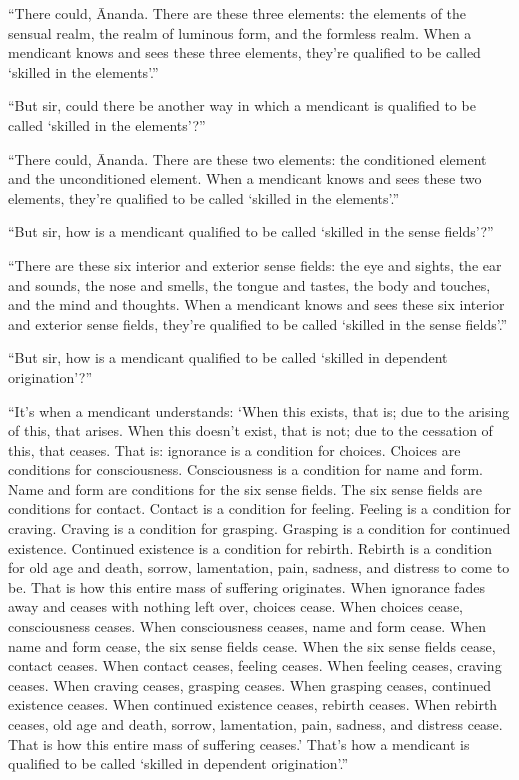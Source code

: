 \documentclass[12pt,openany]{book}%
\begin{document}
“There could, Ānanda. There are these three elements: the elements of the sensual realm, the realm of luminous form, and the formless realm. When a mendicant knows and sees these three elements, they’re qualified to be called ‘skilled in the elements’.” 

“But sir, could there be another way in which a mendicant is qualified to be called ‘skilled in the elements’?” 

“There could, Ānanda. There are these two elements: the conditioned element and the unconditioned element. When a mendicant knows and sees these two elements, they’re qualified to be called ‘skilled in the elements’.” 

“But sir, how is a mendicant qualified to be called ‘skilled in the sense fields’?” 

“There are these six interior and exterior sense fields: the eye and sights, the ear and sounds, the nose and smells, the tongue and tastes, the body and touches, and the mind and thoughts. When a mendicant knows and sees these six interior and exterior sense fields, they’re qualified to be called ‘skilled in the sense fields’.” 

“But sir, how is a mendicant qualified to be called ‘skilled in dependent origination’?” 

“It’s when a mendicant understands: ‘When this exists, that is; due to the arising of this, that arises. When this doesn’t exist, that is not; due to the cessation of this, that ceases. That is: ignorance is a condition for choices. Choices are conditions for consciousness. Consciousness is a condition for name and form. Name and form are conditions for the six sense fields. The six sense fields are conditions for contact. Contact is a condition for feeling. Feeling is a condition for craving. Craving is a condition for grasping. Grasping is a condition for continued existence. Continued existence is a condition for rebirth. Rebirth is a condition for old age and death, sorrow, lamentation, pain, sadness, and distress to come to be. That is how this entire mass of suffering originates. When ignorance fades away and ceases with nothing left over, choices cease. When choices cease, consciousness ceases. When consciousness ceases, name and form cease. When name and form cease, the six sense fields cease. When the six sense fields cease, contact ceases. When contact ceases, feeling ceases. When feeling ceases, craving ceases. When craving ceases, grasping ceases. When grasping ceases, continued existence ceases. When continued existence ceases, rebirth ceases. When rebirth ceases, old age and death, sorrow, lamentation, pain, sadness, and distress cease. That is how this entire mass of suffering ceases.’ That’s how a mendicant is qualified to be called ‘skilled in dependent origination’.” 
\end{document}
